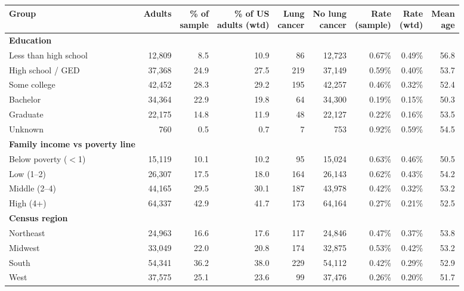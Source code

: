 \begin{tabular*}{\textwidth}{@{\extracolsep{\fill}}lrrrrrrrr}
\toprule
Group & Adults & \makecell[b]{\% of\\{}sample} & \makecell[b]{\% of US\\{}adults (wtd)} & \makecell[b]{Lung\\{}cancer} & \makecell[b]{No lung\\{}cancer} & \makecell[b]{Rate\\{}(sample)} & \makecell[b]{Rate\\{}(wtd)} & \makecell[b]{Mean\\{}age} \\
\midrule
\textbf{Education} &  &  &  &  &  &  &  &  \\
\quad Less than high school & 12,809 & 8.5 & 10.9 & 86 & 12,723 & 0.67\% & 0.49\% & 56.8 \\
\quad High school / GED & 37,368 & 24.9 & 27.5 & 219 & 37,149 & 0.59\% & 0.40\% & 53.7 \\
\quad Some college & 42,452 & 28.3 & 29.2 & 195 & 42,257 & 0.46\% & 0.32\% & 52.4 \\
\quad Bachelor & 34,364 & 22.9 & 19.8 & 64 & 34,300 & 0.19\% & 0.15\% & 50.3 \\
\quad Graduate & 22,175 & 14.8 & 11.9 & 48 & 22,127 & 0.22\% & 0.16\% & 53.5 \\
\quad Unknown & 760 & 0.5 & 0.7 & 7 & 753 & 0.92\% & 0.59\% & 54.5 \\
\midrule
\textbf{Family income vs poverty line} &  &  &  &  &  &  &  &  \\
\quad Below poverty ($<$1) & 15,119 & 10.1 & 10.2 & 95 & 15,024 & 0.63\% & 0.46\% & 50.5 \\
\quad Low (1--2) & 26,307 & 17.5 & 18.0 & 164 & 26,143 & 0.62\% & 0.43\% & 54.2 \\
\quad Middle (2--4) & 44,165 & 29.5 & 30.1 & 187 & 43,978 & 0.42\% & 0.32\% & 53.2 \\
\quad High (4+) & 64,337 & 42.9 & 41.7 & 173 & 64,164 & 0.27\% & 0.21\% & 52.5 \\
\midrule
\textbf{Census region} &  &  &  &  &  &  &  &  \\
\quad Northeast & 24,963 & 16.6 & 17.6 & 117 & 24,846 & 0.47\% & 0.37\% & 53.8 \\
\quad Midwest & 33,049 & 22.0 & 20.8 & 174 & 32,875 & 0.53\% & 0.42\% & 53.2 \\
\quad South & 54,341 & 36.2 & 38.0 & 229 & 54,112 & 0.42\% & 0.29\% & 52.9 \\
\quad West & 37,575 & 25.1 & 23.6 & 99 & 37,476 & 0.26\% & 0.20\% & 51.7 \\

\end{tabular*}
